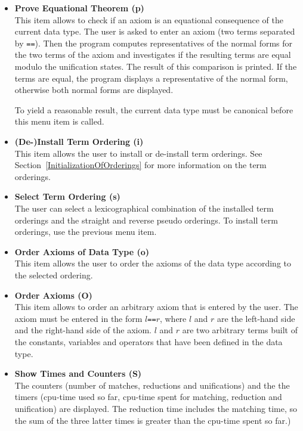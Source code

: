 \begin{itemize}
\item {\bf Prove Equational Theorem (p)}\\
This item allows to check if an axiom is an equational consequence of
the current data type. The user is asked to enter an axiom (two terms
separated by {\tt ==}). Then the program computes representatives of
the normal forms for the two terms of the axiom and investigates if the
resulting terms are equal modulo the unification states.  The result of
this comparison is printed.  If the terms are equal, the program
displays a representative of the normal form, otherwise both normal
forms are displayed.

To yield a reasonable result, the current data type must be canonical
before this menu item is called.

\item {\bf (De-)Install Term Ordering (i)}\\
This item allows the user to install or de-install term orderings. See 
Section~\ref{InitializationOfOrderings} for more information on the
term orderings.

\item {\bf Select Term Ordering (s)}\\
The user can select a lexicographical combination of the installed
term orderings and the straight and reverse pseudo orderings.
To install term orderings, use the previous menu item.

\item {\bf Order Axioms of Data Type (o)}\\
This item allows the user to order the axioms of the data type 
according to the selected ordering.

\item {\bf Order Axioms (O)}\\
This item allows to order an arbitrary axiom that is entered by the user.
The axiom must be entered in the form $l${\tt ==}$r$, where $l$ and $r$
are the left-hand side and the right-hand side of the axiom. $l$ and $r$
are two arbitrary terms built of the constants, variables and operators
that have been defined in the data type.

\item {\bf Show Times and Counters (S)}\\
The counters (number of matches, reductions and unifications) and the 
the timers (cpu-time used so far, cpu-time spent for matching,
reduction and unification) are displayed.
The reduction time includes the matching time, so the sum
of the three latter times is greater than the cpu-time spent so far.)


\end{itemize}
